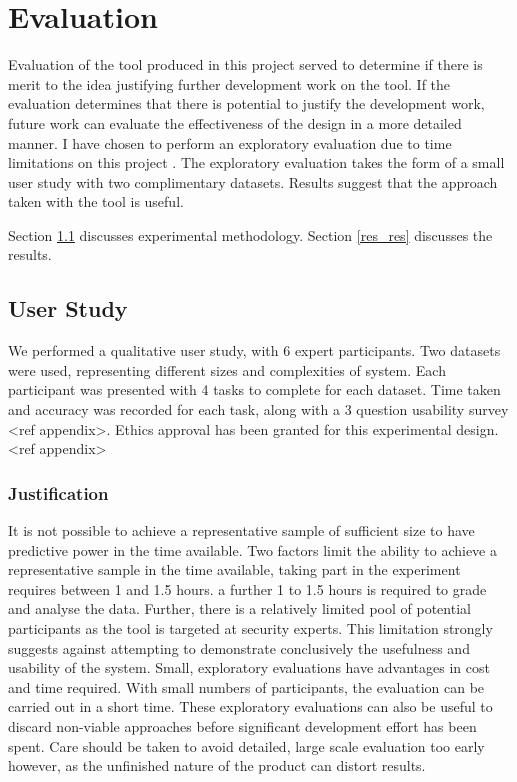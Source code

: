 \chapter{Evaluation}\label{eval}

Evaluation of the tool produced in this project served to determine if there is merit to the idea justifying further development work on the tool. If the evaluation determines that there is potential to justify the development work, future work can evaluate the effectiveness of the design in a more detailed manner. I have chosen to perform an exploratory evaluation due to time limitations on this project \cite{Ellis:2006:EAU:1168149.1168152}. The exploratory evaluation takes the form of a small user study with two complimentary datasets. Results suggest that the approach taken with the tool is useful. 

Section \ref{res_study} discusses experimental methodology. Section \ref{res_res} discusses the results. 

\section{User Study}\label{res_study}

We performed a qualitative user study, with 6 expert participants. Two datasets were used, representing different sizes and complexities of system. Each participant was presented with 4 tasks to complete for each dataset. Time taken and accuracy was recorded for each task, along with a 3 question usability survey <ref appendix>. 
Ethics approval has been granted for this experimental design.<ref appendix> 

\subsection{Justification}
It is not possible to achieve a representative sample of sufficient size to have predictive power in the time available. Two factors limit the ability to achieve a representative sample in the time available, taking part in the experiment requires between 1 and 1.5 hours. a further 1 to 1.5 hours is required to grade and analyse the data. Further, there is a relatively limited pool of potential participants as the tool is targeted at security experts. This limitation strongly suggests against attempting to demonstrate conclusively the usefulness and usability of the system. Small, exploratory evaluations have advantages in cost and time required. With small numbers of participants, the evaluation can be carried out in a short time. These exploratory evaluations can also be useful to discard non-viable approaches before significant development effort has been spent. Care should be taken to avoid detailed, large scale evaluation too early however, as the unfinished nature of the product can distort results. 

